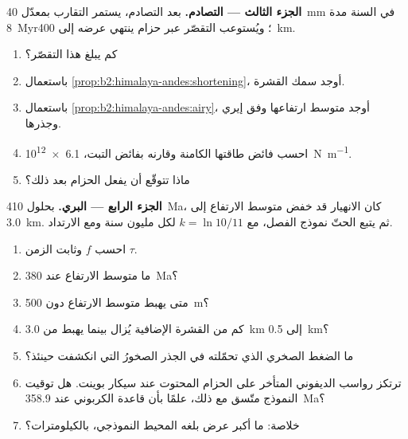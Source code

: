 \begin{problem}
\noindent\textbf{الجزء الثالث --- التصادم.} بعد التصادم، يستمر التقارب بمعدّل
\qty{40}{mm} في السنة مدة \qty{8}{Myr}؛ ويُستوعب التقصّر عبر حزام ينتهي عرضه إلى
\qty{400}{km}.
\begin{enumerate}[resume]
\item كم يبلغ هذا التقصّر؟
\item باستعمال \cref{prop:b2:himalaya-andes:shortening}، أوجد سمك القشرة.
\item باستعمال \cref{prop:b2:himalaya-andes:airy}، أوجد متوسط ارتفاعها وفق إيري وجذرها.
\item احسب فائض طاقتها الكامنة وقارنه بفائض التبت،
\qty{6.1e12}{N.m^{-1}}.
\item ماذا تتوقّع أن يفعل الحزام بعد ذلك؟
\end{enumerate}

\noindent\textbf{الجزء الرابع --- البري.} بحلول \qty{410}{Ma}، كان الانهيار قد خفض متوسط
الارتفاع إلى \qty{3.0}{km}. ثم يتبع الحتّ نموذج الفصل، مع $k = \ln
10/11$ لكل مليون سنة ومع الارتداد.
\begin{enumerate}[resume]
\item احسب $f$ وثابت الزمن $\tau$.
\item ما متوسط الارتفاع عند \qty{380}{Ma}؟
\item متى يهبط متوسط الارتفاع دون \qty{500}{m}؟
\item كم من القشرة الإضافية يُزال بينما يهبط من \qty{3.0}{km} إلى \qty{0.5}{km}؟
\item ما الضغط الصخري الذي تحمّلته في الجذر الصخورُ التي انكشفت حينئذ؟
\item ترتكز رواسب الديفوني المتأخر على الحزام المحتوت عند سيكار بوينت. هل توقيت النموذج
متّسق مع ذلك، علمًا بأن قاعدة الكربوني عند \qty{358.9}{Ma}؟
\item خلاصة: ما أكبر عرض بلغه المحيط النموذجي، بالكيلومترات؟
\end{enumerate}
\end{problem}
